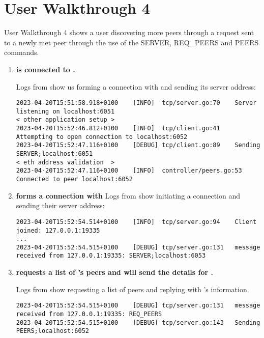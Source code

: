 
\section*{User Walkthrough 4}

User Walkthrough 4 shows a user discovering more peers through a request sent to a newly met peer through the use of the SERVER, REQ\_PEERS and PEERS commands.

\begin{enumerate}[itemsep=2.5pt]

  \item \textbf{ is connected to .}
  
  Logs from  show us forming a connection with  and sending its server address:

\begin{lstlisting}[breaklines=true, postbreak=\mbox{\textcolor{red}{$\hookrightarrow$}\space}]
2023-04-20T15:51:58.918+0100	[INFO]	tcp/server.go:70	Server listening on localhost:6051
< other application setup >
2023-04-20T15:52:46.812+0100	[INFO]	tcp/client.go:41	Attempting to open connection to localhost:6052
2023-04-20T15:52:47.116+0100	[DEBUG]	tcp/client.go:89	Sending SERVER;localhost:6051
< eth address validation  > 
2023-04-20T15:52:47.116+0100	[INFO]	controller/peers.go:53	Connected to peer localhost:6052
\end{lstlisting}

  \item \textbf{ forms a connection with }
  Logs from  show  initiating a connection and sending their server address:

\begin{lstlisting}[breaklines=true, postbreak=\mbox{\textcolor{red}{$\hookrightarrow$}\space}]
2023-04-20T15:52:54.514+0100	[INFO]	tcp/server.go:94	Client joined: 127.0.0.1:19335
...
2023-04-20T15:52:54.515+0100	[DEBUG]	tcp/server.go:131	message received from 127.0.0.1:19335: SERVER;localhost:6053
\end{lstlisting}

  \item \textbf{ requests a list of 's peers and  will send the details for .}
  
  Logs from  show  requesting a list of peers and  replying with 's information.

\begin{lstlisting}[breaklines=true, postbreak=\mbox{\textcolor{red}{$\hookrightarrow$}\space}]
2023-04-20T15:52:54.515+0100	[DEBUG]	tcp/server.go:131	message received from 127.0.0.1:19335: REQ_PEERS
2023-04-20T15:52:54.515+0100	[DEBUG]	tcp/server.go:143	Sending PEERS;localhost:6052
\end{lstlisting}


\end{enumerate}
